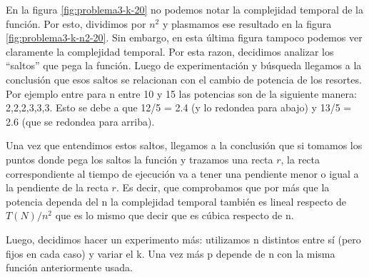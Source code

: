 En la figura \ref{fig:problema3-k-20} no podemos notar la complejidad temporal de la función. Por esto, dividimos por $n^2$ y plasmamos ese resultado en la figura \ref{fig:problema3-k-n2-20}. Sin embargo, en esta última figura tampoco podemos ver claramente la complejidad temporal. Por esta razon, decidimos analizar los ``saltos'' que pega la función. Luego de experimentación y búsqueda llegamos a la conclusión que esos saltos se relacionan con el cambio de potencia de los resortes. Por ejemplo entre para n entre 10 y 15 las potencias son de la siguiente manera: 2,2,2,3,3,3. Esto se debe a que 12/5 = 2.4 (y lo redondea para abajo) y 13/5 = 2.6 (que se redondea para arriba).

Una vez que entendimos estos saltos, llegamos a la conclusión que si tomamos los puntos donde pega los saltos la función y trazamos una recta $r$, la recta correspondiente al tiempo de ejecución va a tener una pendiente menor o igual a la pendiente de la recta $r$. Es decir, que comprobamos que por más que la potencia dependa del n la complejidad temporal también es lineal respecto de $T(N)/n^2$ que es lo mismo que decir que es cúbica respecto de n.

Luego, decidimos hacer un experimento más: utilizamos n distintos entre sí (pero fijos en cada caso) y variar el k. Una vez más p depende de n con la misma función anteriormente usada.

